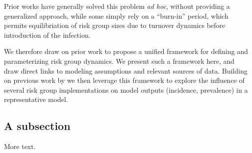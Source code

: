 \documentclass[12pt]{article}
\begin{document}
Prior works have generally solved this problem \textit{ad hoc},
without providing a generalized approach, %
while some simply rely on a ``burn-in'' period, %
which permits equilibriation of risk group sizes due to turnover dynamics
before introduction of the infection.
\par
We therefore draw on prior work to propose a unified framework for
defining and parameterizing risk group dynamics.
We present such a framework here,
and draw direct links to modeling assumptions and relevant sources of data. %
Building on previous work by%
we then leverage this framework to explore the influence of %
several risk group implementations on model outputs (incidence, prevalence) %
in a representative model. %




\subsection{A subsection}

More text.
\end{document}
